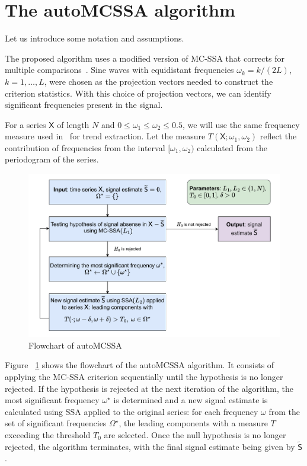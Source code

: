 \documentclass[12pt]{article}
\begin{document}
\section{The autoMCSSA algorithm}
Let us introduce some notation and assumptions.

The proposed algorithm uses a modified version of MC-SSA that corrects for multiple comparisons~\cite{Golyandina2023}. Sine waves with equidistant frequencies $\omega_k=k/(2L)$, $k=1,\ldots,L$, were chosen as the projection vectors needed to construct the criterion statistics. With this choice of projection vectors, we can identify significant frequencies present in the signal.

For a series $\mathsf{X}$ of length $N$ and $0\leqslant\omega_1\leqslant\omega_2\leqslant0.5$, we will use the same frequency measure used in~\cite{alexandrov} for trend extraction.
Let the measure $T(\mathsf{X};\omega_1,\omega_2)$ reflect the contribution of frequencies from the interval $[\omega_1,\omega_2)$ calculated from the periodogram of the series.

\begin{figure}[htbp]
    \centering
    \includegraphics[width=\textwidth]{img/auto_mcssa_alg.pdf}
    \caption{Flowchart of autoMCSSA}
    \label{fig:autoMCSSA_alg}
\end{figure}

Figure ~\ref{fig:autoMCSSA_alg} shows the flowchart of the autoMCSSA algorithm. It consists of applying the MC-SSA criterion sequentially until the hypothesis is no longer rejected. If the hypothesis is rejected at the next iteration of the algorithm, the most significant frequency $\omega^\star$ is determined and a new signal estimate is calculated using SSA applied to the original series: for each frequency $\omega$ from the set of significant frequencies $\Omega^\star$, the leading components with a measure $T$ exceeding the threshold $T_0$ are selected. Once the null hypothesis is no longer rejected, the algorithm terminates, with the final signal estimate being given by $\widetilde{\mathsf{S}}$ .
\end{document}
